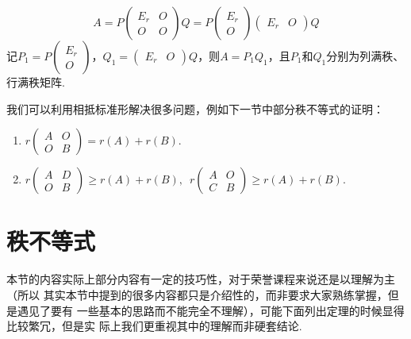 \[A=P\begin{pmatrix}
    E_r & O \\ O & O
\end{pmatrix}Q=P\begin{pmatrix}
    E_r \\ O
\end{pmatrix}\begin{pmatrix}
    E_r & O
\end{pmatrix}Q\]
记$P_1=P\begin{pmatrix}
    E_r \\ O
\end{pmatrix}$，$Q_1=\begin{pmatrix}
    E_r & O
\end{pmatrix}Q$，则$A=P_1Q_1$，且$P_1$和$Q_1$分别为列满秩、行满秩矩阵.

我们可以利用相抵标准形解决很多问题，例如下一节中部分秩不等式的证明：
\begin{example}
    \begin{enumerate}
        \item $r\begin{pmatrix}
            A & O \\ O & B
        \end{pmatrix}=r(A)+r(B)$.

        \item $r\begin{pmatrix}
            A & D \\ O & B
        \end{pmatrix}\geqslant r(A)+r(B),\enspace r\begin{pmatrix}
            A & O \\ C & B
        \end{pmatrix}\geqslant r(A)+r(B)$.
    \end{enumerate}
\end{example}

\section{秩不等式}
本节的内容实际上部分内容有一定的技巧性，对于荣誉课程来说还是以理解为主（所以
其实本节中提到的很多内容都只是介绍性的，而非要求大家熟练掌握，但是遇见了要有
一些基本的思路而不能完全不理解），可能下面列出定理的时候显得比较繁冗，但是实
际上我们更重视其中的理解而非硬套结论.

